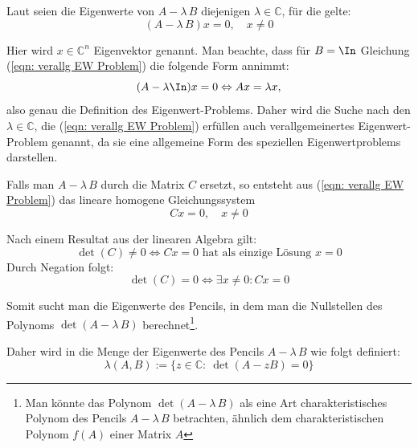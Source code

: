 \documentclass[a4paper,12pt]{report}
\newcommand{\C}{\mathbb C}
\newcommand{\AlamB}{A-\lambda\,B}
\theoremstyle{plain} %
\theoremstyle{definition} %
\newtheorem{definition}[theorem]{Definition}
\theoremstyle{remark}
\begin{document}
            Laut \cite[S. 375]{matrixGolub} seien die Eigenwerte von $\AlamB$ diejenigen $\lambda \in\C$, für die gelte:
            \begin{equation}
                  \label{eqn: verallg EW Problem}
                  (\AlamB)x=0,\quad x\ne 0
            \end{equation}
            
            Hier wird $x\in\C^n$ Eigenvektor genannt.
            Man beachte, dass für $B=\In$ Gleichung (\ref{eqn: verallg EW Problem}) die folgende Form annimmt:
            $$(A-\lambda\In)x=0 \Leftrightarrow Ax = \lambda x,$$
            also genau die Definition des Eigenwert-Problems.
            Daher wird die Suche nach den $\lambda\in\C$, die (\ref{eqn: verallg EW Problem}) erfüllen auch verallgemeinertes Eigenwert-Problem genannt, da sie eine allgemeine Form des speziellen Eigenwertproblems darstellen.

            Falls man $\AlamB$ durch die Matrix $C$ ersetzt, so entsteht aus (\ref{eqn: verallg EW Problem}) das lineare homogene Gleichungssystem
            $$Cx=0,\quad x\ne 0$$

            Nach einem Resultat aus der linearen Algebra gilt:
            $$\det(C)\ne 0 \Leftrightarrow Cx=0 \text{ hat als einzige Lösung }x=0$$
            Durch Negation folgt:
            $$\det(C)=0 \Leftrightarrow \exists x\ne 0: Cx=0$$

            Somit sucht man die Eigenwerte des Pencils, in dem man die Nullstellen des Polynoms $\det(\AlamB)$ berechnet\footnote{Man könnte das Polynom $\det(\AlamB)$ als eine Art charakteristisches Polynom des Pencils $\AlamB$ betrachten, ähnlich dem charakteristischen Polynom $f(A)$ einer Matrix $A$}.
            
            Daher wird in \cite[S. 375]{matrixGolub} die Menge der Eigenwerte des Pencils $\AlamB$ wie folgt definiert:
            \begin{equation}
                  \label{def: EW Pencil}
                  \lambda(A,B):=\{z\in\C:\ \det(A - zB) = 0\}
            \end{equation}


\end{document}
